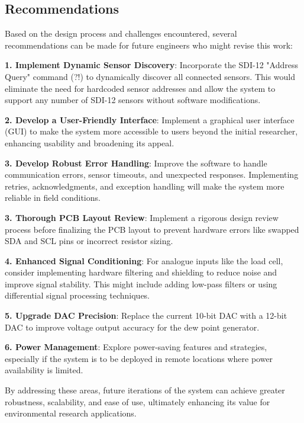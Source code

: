\subsection{Recommendations}


Based on the design process and challenges encountered, several recommendations can be made for future engineers who might revise this work:

\textbf{1. Implement Dynamic Sensor Discovery}: Incorporate the SDI-12 "Address Query" command (?!) to dynamically discover all connected sensors. This would eliminate the need for hardcoded sensor addresses and allow the system to support any number of SDI-12 sensors without software modifications.

\textbf{2. Develop a User-Friendly Interface}: Implement a graphical user interface (GUI) to make the system more accessible to users beyond the initial researcher, enhancing usability and broadening its appeal.

\textbf{3. Develop Robust Error Handling}: Improve the software to handle communication errors, sensor timeouts, and unexpected responses. Implementing retries, acknowledgments, and exception handling will make the system more reliable in field conditions.

\textbf{3. Thorough PCB Layout Review}: Implement a rigorous design review process before finalizing the PCB layout to prevent hardware errors like swapped SDA and SCL pins or incorrect resistor sizing.

\textbf{4. Enhanced Signal Conditioning}: For analogue inputs like the load cell, consider implementing hardware filtering and shielding to reduce noise and improve signal stability. This might include adding low-pass filters or using differential signal processing techniques.

\textbf{5. Upgrade DAC Precision}: Replace the current 10-bit DAC with a 12-bit DAC to improve voltage output accuracy for the dew point generator.

\textbf{6. Power Management}: Explore power-saving features and strategies, especially if the system is to be deployed in remote locations where power availability is limited.

By addressing these areas, future iterations of the system can achieve greater robustness, scalability, and ease of use, ultimately enhancing its value for environmental research applications.